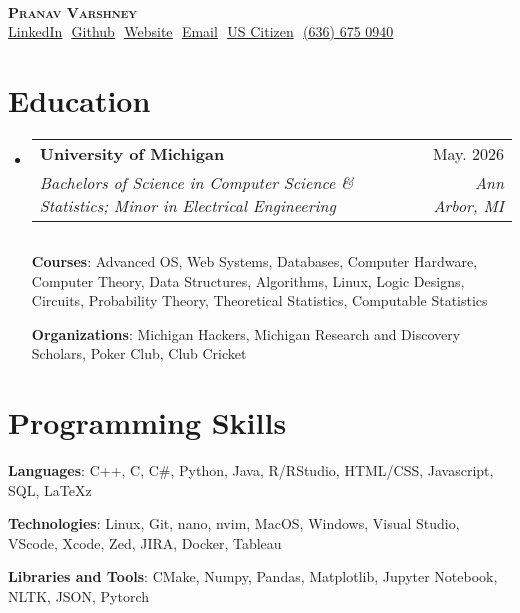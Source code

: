 \documentclass[letterpaper,11pt]{article}
\makeatletter
\newcommand{\resumeSubheading}[4]{
  \vspace{-2pt}\item
    \begin{tabular*}{0.97\textwidth}[t]{l@{\extracolsep{\fill}}r}
      \textbf{#1} & #2 \\
      \textit{\small#3} & \textit{\small #4} \\
    \end{tabular*}\vspace{-7pt}
}
\newcommand{\resumeSubHeadingListStart}{\begin{itemize}[leftmargin=0.15in, 
label={}]}
\newcommand{\resumeSubHeadingListEnd}{\end{itemize}}
\makeatother
\begin{document}

\begin{center}
\textbf{} \\ \vspace{2pt}
    \textbf{\Huge \scshape Pranav Varshney} \\ \vspace{4pt}
    \small 
    \href{https://linkedin.com/in/pvarshh}{\underline{LinkedIn}} $ $
    \href{https://github.com/pvarshh}{\underline{Github}} $ $
    \href{https://pvarshh.github.io/TermNav/}
    {\underline{Website}} $  $
    \href{mailto:pvarsh@umich.edu}
    {\underline{Email}} $ $
    {\underline{US Citizen}} $ $
    {\underline{(636) 675 0940}}
\end{center}


\section{Education}
  \resumeSubHeadingListStart
    \resumeSubheading
      {University of Michigan }{May. 2026}
      {Bachelors of Science in Computer Science \& Statistics; Minor in 
Electrical Engineering}{Ann Arbor, MI} $ $

      \textbf{Courses}{: Advanced OS, Web Systems, Databases, Computer 
Hardware, Computer Theory, Data Structures, Algorithms, Linux, Logic 
Designs, Circuits, Probability Theory, Theoretical Statistics, Computable 
Statistics}

      \vspace{-2pt}

      \textbf{Organizations}{: Michigan Hackers, Michigan Research and 
Discovery Scholars, Poker Club, Club Cricket}

  \resumeSubHeadingListEnd

\section{Programming Skills}
 \begin{itemize}[leftmargin=0.15in, label={}]
    \small{\item{

     \textbf{Languages}{: C++, C, C\#, Python, Java, R/RStudio, HTML/CSS, 
Javascript, SQL, LaTeXz} $ $

     \textbf{Technologies}{: Linux, Git, nano, nvim, MacOS, Windows, 
Visual Studio, VScode, Xcode, Zed, JIRA, Docker, Tableau} $ $

     \textbf{Libraries and Tools}{: CMake, Numpy, Pandas, Matplotlib, 
Jupyter Notebook, NLTK, JSON, Pytorch} $ $

    }}
 \end{itemize}
\end{document}
